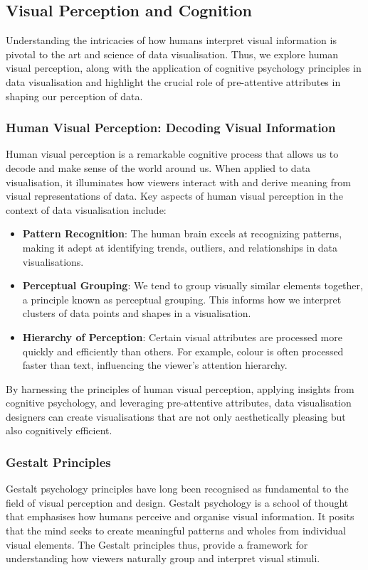 \documentclass{article}\usepackage[]{graphicx}\usepackage[]{xcolor}
\begin{document}
\subsection{Visual Perception and Cognition}
Understanding the intricacies of how humans interpret visual information is pivotal to the art and science of data visualisation. Thus, we explore human visual perception, along with the application of cognitive psychology principles in data visualisation and highlight the crucial role of pre-attentive attributes in shaping our perception of data. 

\subsubsection{Human Visual Perception: Decoding Visual Information}
Human visual perception is a remarkable cognitive process that allows us to decode and make sense of the world around us. When applied to data visualisation, it illuminates how viewers interact with and derive meaning from visual representations of data. Key aspects of human visual perception in the context of data visualisation include:
\begin{itemize}
    \item \textbf{Pattern Recognition}: The human brain excels at recognizing patterns, making it adept at identifying trends, outliers, and relationships in data visualisations.
    \item \textbf{Perceptual Grouping}: We tend to group visually similar elements together, a principle known as perceptual grouping. This informs how we interpret clusters of data points and shapes in a visualisation.
    \item \textbf{Hierarchy of Perception}: Certain visual attributes are processed more quickly and efficiently than others. For example, colour is often processed faster than text, influencing the viewer's attention hierarchy.
\end{itemize}

By harnessing the principles of human visual perception, applying insights from cognitive psychology, and leveraging pre-attentive attributes, data visualisation designers can create visualisations that are not only aesthetically pleasing but also cognitively efficient.	

\subsubsection{Gestalt Principles}
Gestalt psychology principles have long been recognised as fundamental to the field of visual perception and design. Gestalt psychology is a school of thought that emphasises how humans perceive and organise visual information. It posits that the mind seeks to create meaningful patterns and wholes from individual visual elements. The Gestalt principles thus, provide a framework for understanding how viewers naturally group and interpret visual stimuli.\\
\end{document}
